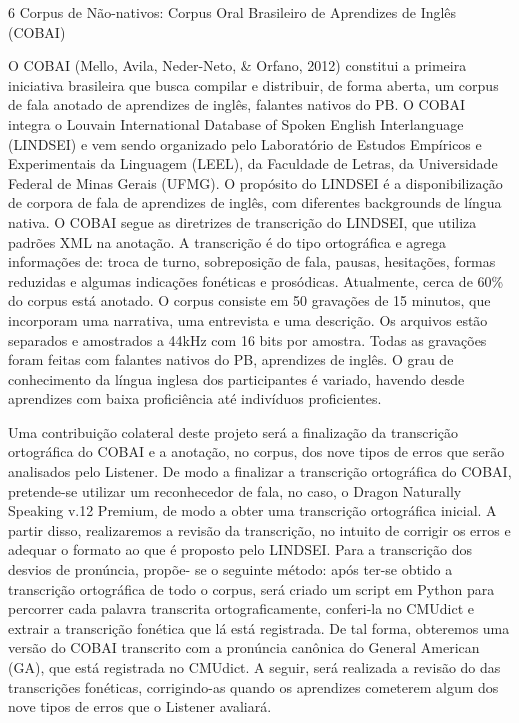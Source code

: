 6 Corpus de N\~ao-nativos: Corpus Oral Brasileiro de Aprendizes de Ingl\^es
(COBAI)

O COBAI (Mello, Avila, Neder-Neto, \& Orfano, 2012) constitui a primeira
iniciativa brasileira que busca compilar e distribuir, de forma aberta,
um corpus de fala anotado de aprendizes de ingl\^es, falantes nativos do
PB. O COBAI integra o Louvain International Database of Spoken English
Interlanguage (LINDSEI) e vem sendo organizado pelo Laborat\'orio de
Estudos Emp\'iricos e Experimentais da Linguagem (LEEL), da Faculdade de
Letras, da Universidade Federal de Minas Gerais (UFMG). O prop\'osito do
LINDSEI \'e a disponibiliza\c{c}\~ao de corpora de fala de aprendizes de ingl\^es,
com diferentes backgrounds de l\'ingua nativa. O COBAI segue as diretrizes
de transcri\c{c}\~ao do LINDSEI, que utiliza padr\~oes XML na anota\c{c}\~ao. A
transcri\c{c}\~ao \'e do tipo ortogr\'afica e agrega informa\c{c}\~oes de: troca de
turno, sobreposi\c{c}\~ao de fala, pausas, hesita\c{c}\~oes, formas reduzidas e
algumas indica\c{c}\~oes fon\'eticas e pros\'odicas. Atualmente, cerca de 60\% do
corpus est\'a anotado. O corpus consiste em 50 grava\c{c}\~oes de 15 minutos,
que incorporam uma narrativa, uma entrevista e uma descri\c{c}\~ao. Os
arquivos est\~ao separados e amostrados a 44kHz com 16 bits por amostra.
Todas as grava\c{c}\~oes foram feitas com falantes nativos do PB, aprendizes
de ingl\^es. O grau de conhecimento da l\'ingua inglesa dos participantes \'e
variado, havendo desde aprendizes com baixa profici\^encia at\'e indiv\'iduos
proficientes.

Uma contribui\c{c}\~ao colateral deste projeto ser\'a a finaliza\c{c}\~ao da
transcri\c{c}\~ao ortogr\'afica do COBAI e a anota\c{c}\~ao, no corpus, dos nove tipos
de erros que ser\~ao analisados pelo Listener. De modo a finalizar a
transcri\c{c}\~ao ortogr\'afica do COBAI, pretende-se utilizar um reconhecedor
de fala, no caso, o Dragon Naturally Speaking v.12 Premium, de modo a
obter uma transcri\c{c}\~ao ortogr\'afica inicial. A partir disso, realizaremos
a revis\~ao da transcri\c{c}\~ao, no intuito de corrigir os erros e adequar o
formato ao que \'e proposto pelo LINDSEI. Para a transcri\c{c}\~ao dos desvios
de pron\'uncia, prop\~oe- se o seguinte m\'etodo: ap\'os ter-se obtido a
transcri\c{c}\~ao ortogr\'afica de todo o corpus, ser\'a criado um script em
Python para percorrer cada palavra transcrita ortograficamente,
conferi-la no CMUdict e extrair a transcri\c{c}\~ao fon\'etica que l\'a est\'a
registrada. De tal forma, obteremos uma vers\~ao do COBAI transcrito com a
pron\'uncia can\^onica do General American (GA), que est\'a registrada no
CMUdict. A seguir, ser\'a realizada a revis\~ao do das transcri\c{c}\~oes
fon\'eticas, corrigindo-as quando os aprendizes cometerem algum dos nove
tipos de erros que o Listener avaliar\'a.

